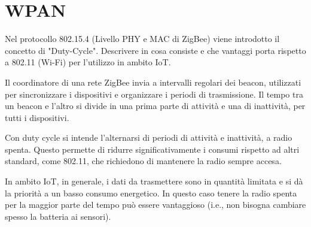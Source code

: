 \section{WPAN}

\begin{questions}
    \question Nel protocollo 802.15.4 (Livello PHY e MAC di ZigBee) viene introdotto il concetto di "Duty-Cycle". Descrivere in cosa consiste e che vantaggi porta rispetto a 802.11 (Wi-Fi) per l'utilizzo in ambito IoT.
    
    \begin{solution}
        Il coordinatore di una rete ZigBee invia a intervalli regolari dei beacon, utilizzati per sincronizzare i dispositivi e organizzare i periodi di trasmissione. Il tempo tra un beacon e l'altro si divide in una prima parte di attività e una di inattività, per tutti i dispositivi. 
        
        Con duty cycle si intende l'alternarsi di periodi di attività e inattività, a radio spenta. Questo permette di ridurre significativamente i consumi rispetto ad altri standard, come 802.11, che richiedono di mantenere la radio sempre accesa. 
        
        In ambito IoT, in generale, i dati da trasmettere sono in quantità limitata e si dà la priorità a un basso consumo energetico. In questo caso tenere la radio spenta per la maggior parte del tempo può essere vantaggioso (i.e., non bisogna cambiare spesso la batteria ai sensori).
    \end{solution}
\end{questions}
